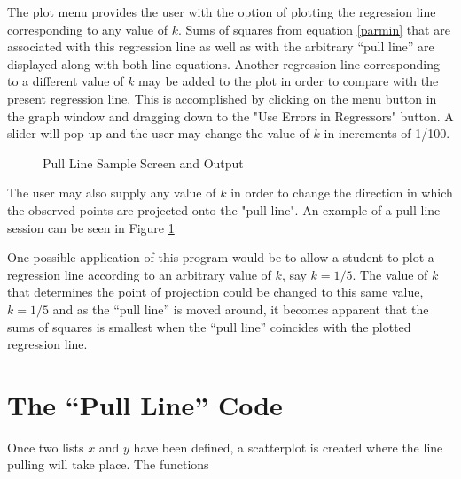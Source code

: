\documentclass[11pt]{report}
\begin{document}
The plot menu provides the user with the option of plotting the regression 
line corresponding to any value of $k$.  Sums of squares from equation \ref{parmin} 
that are associated with
this regression line as well as with the arbitrary ``pull line'' are 
displayed along
with both line equations.  Another 
regression line corresponding to a different value of $k$ may be added
to the plot in order to compare
with the present regression line.  This is accomplished by clicking on the
menu button in the graph window and dragging down to the "Use Errors in 
Regressors" button.  A slider will pop up and the user may change the value
of $k$ in increments of 1/100.  
\begin{figure}
   \centering
   \centerline{}
   \caption{Pull Line Sample Screen and Output\label{pict3}}
\end{figure}

The user may also supply any value of $k$ in order to change the direction in 
which the observed points are projected onto the "pull line".  An example of 
a pull line session can be seen in Figure \ref{pict3} 

     One possible application of this program would be to allow a student
to plot a regression line according to an arbitrary value of $k$, say $k=1/5$. 
The value of $k$ that determines the point of projection could be changed to
this same value, $k=1/5$ and as the ``pull line'' is moved around, it 
becomes apparent that the sums of squares is smallest when the ``pull line''
coincides with the plotted regression line.


\section{The ``Pull Line'' Code} 
    Once two lists $x$ and $y$  have been defined, a scatterplot is created
where the line pulling will take place.  The functions
\end{document}
